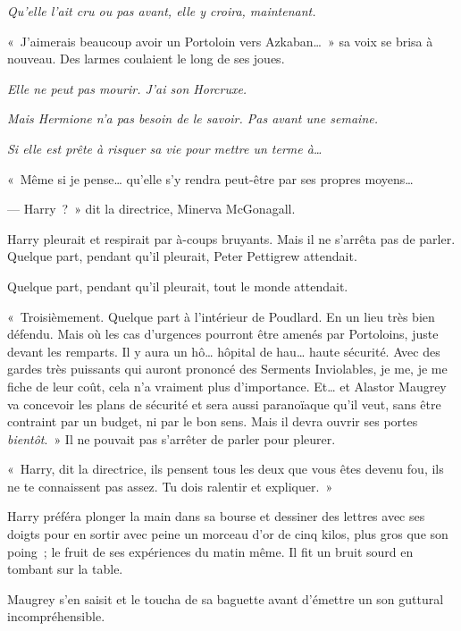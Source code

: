 \emph{Qu'elle l'ait cru ou pas avant, elle y croira, maintenant.}

«~J'aimerais beaucoup avoir un Portoloin vers Azkaban…~» sa voix se brisa à nouveau. Des larmes coulaient le long de ses joues.

\emph{Elle ne peut pas mourir. J'ai son Horcruxe.}

\emph{Mais Hermione n'a pas besoin de le savoir. Pas avant une semaine.}

\emph{Si elle est prête à risquer sa vie pour mettre un terme à…}

«~Même si je pense… qu'elle s'y rendra peut-être par ses propres moyens…

--- Harry~?~» dit la directrice, Minerva McGonagall.

Harry pleurait et respirait par à-coups bruyants. Mais il ne s'arrêta pas de parler. Quelque part, pendant qu'il pleurait, Peter Pettigrew attendait.

Quelque part, pendant qu'il pleurait, tout le monde attendait.

«~Troisièmement. Quelque part à l'intérieur de Poudlard. En un lieu très bien défendu. Mais où les cas d'urgences pourront être amenés par Portoloins, juste devant les remparts. Il y aura un hô… hôpital de hau… haute sécurité. Avec des gardes très puissants qui auront prononcé des Serments Inviolables, je me, je me fiche de leur coût, cela n'a vraiment plus d'importance. Et… et Alastor Maugrey va concevoir les plans de sécurité et sera aussi paranoïaque qu'il veut, sans être contraint par un budget, ni par le bon sens. Mais il devra ouvrir ses portes \emph{bientôt}.~» Il ne pouvait pas s'arrêter de parler pour pleurer.

«~Harry, dit la directrice, ils pensent tous les deux que vous êtes devenu fou, ils ne te connaissent pas assez. Tu dois ralentir et expliquer.~»

Harry préféra plonger la main dans sa bourse et dessiner des lettres avec ses doigts pour en sortir avec peine un morceau d'or de cinq kilos, plus gros que son poing~; le fruit de ses expériences du matin même. Il fit un bruit sourd en tombant sur la table.

Maugrey s'en saisit et le toucha de sa baguette avant d'émettre un son guttural incompréhensible.

